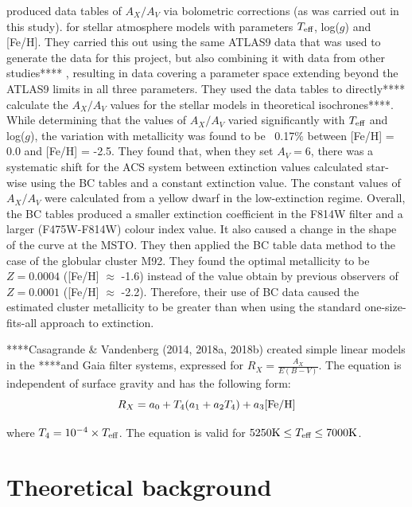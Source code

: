 \documentclass[12pt, a4paper]{report}
\begin{document}
\cite{2008PASP..120..583G} produced data tables of $A_{X}/A_{V}$ via bolometric corrections (as was carried out in this study). for stellar atmosphere models with parameters $T_{\textnormal{eff}}$, log($g$) and [Fe/H]. They carried this out using the same ATLAS9 data \cite{2004astro.ph..5087C} that was used to generate the data for this project, but also combining it with data from other studies**** \cite{2002A&A...391..195G}, resulting in data covering a parameter space extending beyond the ATLAS9 limits in all three parameters. They used the data tables to directly**** calculate the $A_{X}/A_{V}$ values for the stellar models in theoretical isochrones****. While determining that the values of $A_{X}/A_{V}$ varied significantly with $T_{\textnormal{eff}}$ and log($g$), the variation with metallicity was found to be ~0.17$\%$ between [Fe/H] = 0.0 and [Fe/H] = -2.5. They found that, when they set $A_{V} = 6$, there was a systematic shift for the ACS system between extinction values calculated star-wise using the BC tables and a constant extinction value. The constant values of $A_{X}/A_{V}$ were calculated from a yellow dwarf in the low-extinction regime. Overall, the BC tables produced a smaller extinction coefficient in the F814W filter and a larger (F475W-F814W) colour index value. It also caused a change in the shape of the curve at the MSTO. They then applied the BC table data method to the case of the globular cluster M92. They found the optimal metallicity to be $Z = 0.0004$ ([Fe/H] $\approx$ -1.6) instead of the value obtain by previous observers of $Z = 0.0001$ ([Fe/H] $\approx$ -2.2). Therefore, their use of BC data caused the estimated cluster metallicity to be greater than when using the standard one-size-fits-all approach to extinction.

****Casagrande \& Vandenberg (2014, 2018a, 2018b) created simple linear models in the ****and Gaia filter systems, expressed for $R_{X}  = \frac{A_{X}}{E(B-V)}$. The equation is independent of surface gravity and has the following form:
\begin{equation}
R_{X}  = a_{0} + T_{4}(a_{1} + a_{2}T_{4}) + a_{3}\textnormal{[Fe/H]}
\label{casagrande_ext_fit}
\end{equation}

where $T_{4} = 10^{-4} \times T_{\textnormal{eff}}$. The equation is valid for $5250\textnormal{K} \leq T_{\textnormal{eff}} \leq 7000\textnormal{K}$.

\chapter{Theoretical background}
\end{document}
